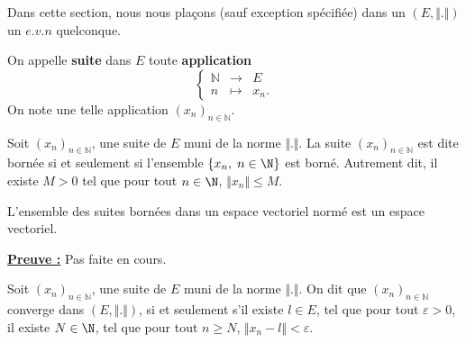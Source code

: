\documentclass[class=report,crop=false]{standalone}
\begin{document}
Dans cette section, nous nous plaçons (sauf exception spécifiée) dans un $(E,\Vert . \Vert)$ un $e.v.n$ quelconque.

\begin{definition}[SUITE]
\textcolor[rgb]{0.73,0.00,0.00}{
\noindent On appelle {\bf suite} dans $E$ toute {\bf application}
\begin{equation*}
\displaystyle\left\{\begin{array}{ccc}\mathbb{N}&\rightarrow&E\\
n&\mapsto& x_n.\end{array}\right.
\end{equation*}
On note une telle application $\left(x_n\right)_{n\in\mathbb{N}}$.}
\end{definition}






 
\begin{definition}
\textcolor[rgb]{0.73,0.00,0.00}{
\noindent Soit $\left(x_n\right)_{n\in\mathbb{N}}$, une suite de $E$ muni de la norme
$\Vert . \Vert$. La suite $\left(x_n\right)_{n\in\mathbb{N}}$ est dite bornée si et seulement si l'ensemble
$\lbrace x_n, \;n \in \N \rbrace$ est borné. Autrement dit, il existe $M>0$ tel que pour tout $n \in \N$, 
$\Vert x_n \Vert \leq M$.
}
\end{definition}

 
 
\begin{proposition}
\textcolor[rgb]{0.50,0.00,0.25}{
L'ensemble des suites bornées dans un espace vectoriel normé est un espace vectoriel.
}
\end{proposition}

 \noindent \underline{\bf Preuve :}
Pas faite en cours.



\begin{definition}
\textcolor[rgb]{0.73,0.00,0.00}{
\noindent Soit $\left(x_n\right)_{n\in\mathbb{N}}$, une suite de $E$ muni de la norme
$\Vert . \Vert$. On dit que $\left(x_n\right)_{n\in\mathbb{N}}$ converge dans $(E, \Vert.\Vert)$,
si et seulement s'il existe $l \in E$, tel que pour tout $\varepsilon >0$, il existe $N \in \N$, tel
que pour tout $n \geq N$, $\Vert x_n -l \Vert < \varepsilon$.
} 
\end{definition}


 

\end{document}
